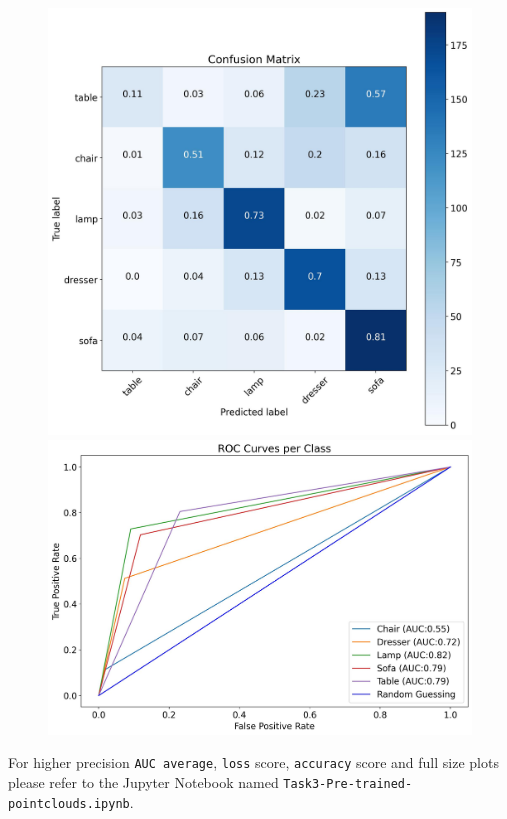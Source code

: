 \documentclass[11pt,a4paper]{article}
\begin{document}
\begin{figure}[H]
{{    \includegraphics[scale=0.13]{imgs/experiments/pointclouds/pointnet-4/PointNet-4-TESTING-confusion-matrix.jpg}
    \includegraphics[scale=0.13]{imgs/experiments/pointclouds/pointnet-4/PointNet-4-TESTING-ROC.jpg}
    }}
\end{figure}
\noindent
For higher precision \texttt{AUC average}, \texttt{loss} score, \texttt{accuracy} score and full size plots please refer to the Jupyter Notebook named \texttt{Task3-Pre-trained-pointclouds.ipynb}.
\end{document}
